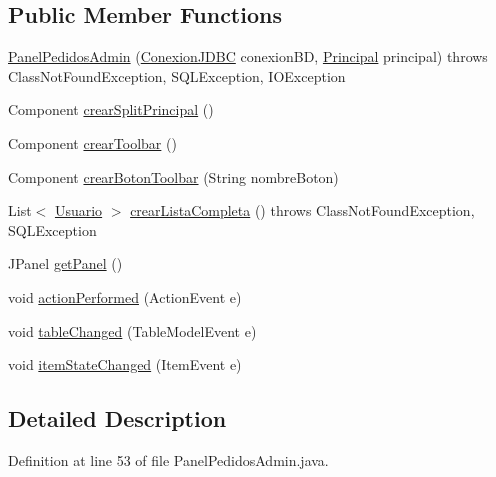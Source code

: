 \subsection*{Public Member Functions}
\begin{DoxyCompactItemize}
\item 
\mbox{\hyperlink{classpaneles_1_1_panel_pedidos_admin_abe62da27a8eab1d1ff135f2d0afd1924}{Panel\+Pedidos\+Admin}} (\mbox{\hyperlink{classmysql_1_1_conexion_j_d_b_c}{Conexion\+J\+D\+BC}} conexion\+BD, \mbox{\hyperlink{classvistas_1_1_principal}{Principal}} principal)  throws Class\+Not\+Found\+Exception, S\+Q\+L\+Exception, I\+O\+Exception 
\item 
Component \mbox{\hyperlink{classpaneles_1_1_panel_pedidos_admin_a700eb718ad003fd6132347117e6842c2}{crear\+Split\+Principal}} ()
\item 
Component \mbox{\hyperlink{classpaneles_1_1_panel_pedidos_admin_a3479b5a4aa009da3d3e99ad6ad689a57}{crear\+Toolbar}} ()
\item 
Component \mbox{\hyperlink{classpaneles_1_1_panel_pedidos_admin_aefe83135ca649c6b08d56372acada534}{crear\+Boton\+Toolbar}} (String nombre\+Boton)
\item 
List$<$ \mbox{\hyperlink{classobjetos_1_1_usuario}{Usuario}} $>$ \mbox{\hyperlink{classpaneles_1_1_panel_pedidos_admin_a3f0248c018216056a00b353d5f13f097}{crear\+Lista\+Completa}} ()  throws Class\+Not\+Found\+Exception, S\+Q\+L\+Exception 
\item 
J\+Panel \mbox{\hyperlink{classpaneles_1_1_panel_pedidos_admin_a76287d5b003f15b41fd889936a6e817e}{get\+Panel}} ()
\item 
void \mbox{\hyperlink{classpaneles_1_1_panel_pedidos_admin_aa7bdfe0ead2f6ae46989dc2f4413790e}{action\+Performed}} (Action\+Event e)
\item 
void \mbox{\hyperlink{classpaneles_1_1_panel_pedidos_admin_a484c4ce5aa6fa7f33fb62eb4b9521940}{table\+Changed}} (Table\+Model\+Event e)
\item 
void \mbox{\hyperlink{classpaneles_1_1_panel_pedidos_admin_a977e74f76b8513055d320e5b976e2143}{item\+State\+Changed}} (Item\+Event e)
\end{DoxyCompactItemize}


\subsection{Detailed Description}


Definition at line 53 of file Panel\+Pedidos\+Admin.\+java.



